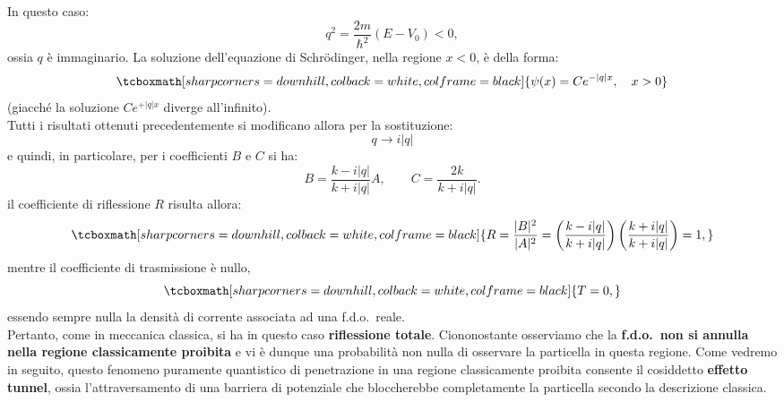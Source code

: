 In questo caso:
	\begin{equation}
		q^2=\frac{2m}{\hbar ^2}\left( E- V_0 \right)<0,
	\end{equation}
ossia $q$ è immaginario. La soluzione dell'equazione di Schr\"{o}dinger, nella regione $x<0$, è della forma:
	\begin{equation}
		\tcboxmath[sharp corners=downhill, colback=white, colframe=black]{	
			\psi (x) = Ce^{-|q|x}, \quad x>0
			}
	\end{equation}
(giacché la soluzione $\displaystyle{Ce^{+|q|x}}$ diverge all'infinito).\\
Tutti i risultati ottenuti precedentemente si modificano allora per la sostituzione:
	\begin{equation}
		q \rightarrow i|q|
	\end{equation}
e quindi, in particolare, per i coefficienti $B$ e $C$ si ha:
	\begin{equation}
		B=\frac{k-i|q|}{k+i|q|}A, \qquad C=\frac{2k}{k+i|q|}.
	\end{equation}
il coefficiente di riflessione $R$ risulta allora:
	\begin{equation}
		\tcboxmath[sharp corners=downhill, colback=white, colframe=black]{	
			R=\frac{|B|^2}{|A|^2}=\left(\frac{k-i|q|}{k+i|q|}\right)\left(\frac{k+i|q|}{k+i|q|}\right)=1,
			}
	\end{equation}
mentre il coefficiente di trasmissione è nullo,
	\begin{equation}
		\tcboxmath[sharp corners=downhill, colback=white, colframe=black]{			
			T=0,
			}
	\end{equation}
essendo sempre nulla la densità di corrente associata ad una f.d.o.~reale.\\

Pertanto, come in meccanica classica, si ha in questo caso \textbf{riflessione totale}. Ciononostante osserviamo che la \textbf{f.d.o.~non si annulla nella regione classicamente proibita} e vi è dunque una probabilità non nulla di osservare la particella in questa regione. Come vedremo in seguito, questo fenomeno puramente quantistico di penetrazione in una regione classicamente proibita consente il cosiddetto \textbf{effetto tunnel}, ossia l'attraversamento di una barriera di potenziale che bloccherebbe completamente la particella secondo la descrizione classica.
